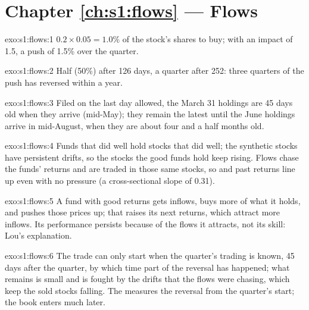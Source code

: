 \section*{Chapter \ref{ch:s1:flows} --- Flows}

\begin{solution}{exo:s1:flows:1}
$0.2 \times 0.05 = 1.0\%$ of the stock's shares to buy; with an impact of 1.5, a push of 1.5\% over the quarter.
\end{solution}

\begin{solution}{exo:s1:flows:2}
Half (50\%) after 126 days, a quarter after 252: three quarters of the push has reversed within a year.
\end{solution}

\begin{solution}{exo:s1:flows:3}
Filed on the last day allowed, the March 31 holdings are 45 days old when they arrive (mid-May); they remain the latest until the June holdings arrive in
mid-August, when they are about four and a half months old.
\end{solution}

\begin{solution}{exo:s1:flows:4}
Funds that did well hold stocks that did well; the synthetic stocks have persistent drifts, so the stocks the good funds hold keep rising. Flows chase the
funds' returns and are traded in those same stocks, so  and past returns line up even with no pressure (a cross-sectional slope of 0.31).
\end{solution}

\begin{solution}{exo:s1:flows:5}
A fund with good returns gets inflows, buys more of what it holds, and pushes those prices up; that raises its next returns, which attract more inflows.
Its performance persists because of the flows it attracts, not its skill: Lou's explanation.
\end{solution}

\begin{solution}{exo:s1:flows:6}
The trade can only start when the quarter's trading is known, 45 days after the quarter, by which time part of the reversal has happened; what remains is
small and is fought by the drifts that the flows were chasing, which keep the sold stocks falling. The  measures the reversal from the quarter's
start; the book enters much later.
\end{solution}

